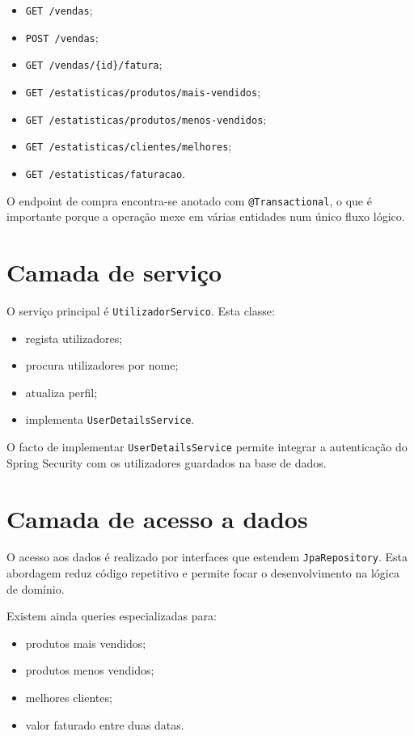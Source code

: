 \documentclass[10pt,a4paper]{report}
\begin{document}
\begin{itemize}
    \item \texttt{GET /vendas};
    \item \texttt{POST /vendas};
    \item \texttt{GET /vendas/\{id\}/fatura};
    \item \texttt{GET /estatisticas/produtos/mais-vendidos};
    \item \texttt{GET /estatisticas/produtos/menos-vendidos};
    \item \texttt{GET /estatisticas/clientes/melhores};
    \item \texttt{GET /estatisticas/faturacao}.
\end{itemize}

O endpoint de compra encontra-se anotado com \texttt{@Transactional}, o que é importante porque a operação mexe em várias entidades num único fluxo lógico.

\section{Camada de serviço}

O serviço principal é \texttt{UtilizadorServico}. Esta classe:

\begin{itemize}
    \item regista utilizadores;
    \item procura utilizadores por nome;
    \item atualiza perfil;
    \item implementa \texttt{UserDetailsService}.
\end{itemize}

O facto de implementar \texttt{UserDetailsService} permite integrar a autenticação do Spring Security com os utilizadores guardados na base de dados.

\section{Camada de acesso a dados}

O acesso aos dados é realizado por interfaces que estendem \texttt{JpaRepository}. Esta abordagem reduz código repetitivo e permite focar o desenvolvimento na lógica de domínio.

Existem ainda queries especializadas para:

\begin{itemize}
    \item produtos mais vendidos;
    \item produtos menos vendidos;
    \item melhores clientes;
    \item valor faturado entre duas datas.
\end{itemize}
\end{document}
